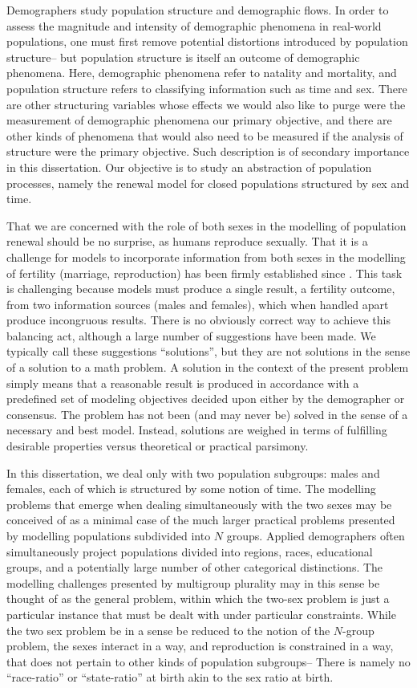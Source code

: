 Demographers study population structure and demographic flows. In order
to assess the magnitude and intensity of demographic phenomena in real-world
populations, one must first remove potential distortions introduced by
population structure-- but population structure is itself an outcome
of demographic phenomena. Here, demographic phenomena refer to natality and
mortality, and population structure refers to classifying information such as
time and sex. There are other structuring variables whose effects we would also
like to purge were the measurement of demographic phenomena 
our primary objective, and there are other kinds of phenomena that would also
need to be measured if the analysis of structure were the primary
objective. Such description is of secondary importance in this dissertation. Our
objective is to study an abstraction of population processes, namely the 
renewal model for closed populations structured by sex and time.

That we are concerned with the role of both sexes in the modelling of population
renewal should be no surprise, as humans reproduce sexually. That it is a
challenge for models to incorporate information from both sexes in the modelling
of fertility (marriage, reproduction) has been firmly established since
\citet{karmel1947relations}. This task is challenging because models must
produce a single result, a fertility outcome, from two information sources
(males and females), which when handled apart produce incongruous results. 
There is no obviously correct way to achieve this balancing act, although a
large number of suggestions have been made. We typically call these suggestions ``solutions'',
but they are not solutions in the sense of a solution to a math problem. A
solution in the context of the present problem simply means that a reasonable
result is produced in accordance with a predefined set of modeling objectives
decided upon either by the demographer or consensus. The problem has not been
(and may never be) solved in the sense of a necessary and best model. Instead,
solutions are weighed in terms of fulfilling desirable properties versus theoretical 
or practical parsimony.

In this dissertation, we deal only with two population subgroups: males and
females, each of which is structured by some notion of time. The modelling
problems that emerge when dealing simultaneously with the two sexes may be
conceived of as a minimal case of the much larger practical problems 
presented by modelling populations subdivided into $N$
groups. Applied demographers often simultaneously project
populations divided into regions, races, educational groups, and a potentially
large number of other categorical distinctions. The modelling
challenges presented by multigroup plurality may in this sense be thought of as
the general problem, within which the two-sex problem is just a particular
instance that must be dealt with under particular constraints. While the two
sex problem be in a sense be reduced to the notion of the $N$-group problem,
the sexes interact in a way, and reproduction is constrained in a way, that does
not pertain to other kinds of population subgroups-- There is namely no
``race-ratio'' or ``state-ratio'' at birth akin to the sex ratio at birth.

